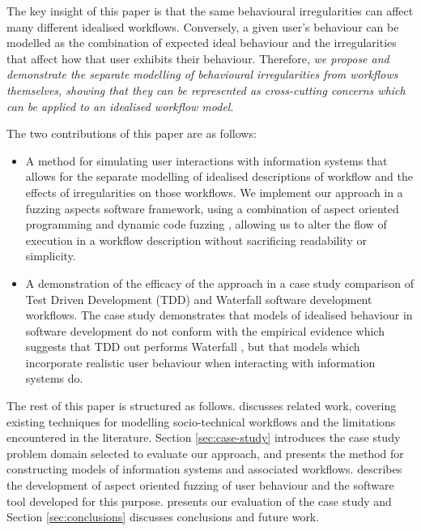 \documentclass{llncs}
\begin{document}
The key insight of this paper is that the same behavioural irregularities can affect many different idealised
workflows.  Conversely, a given user's behaviour can be modelled as the combination of expected ideal behaviour and the
irregularities that affect how that user exhibits their behaviour.  Therefore, \emph{we propose and demonstrate the
  separate modelling of behavioural irregularities from workflows themselves, showing that they can be represented as
  cross-cutting concerns which can be applied to an idealised workflow model}.

The two contributions of this paper are as follows:

\begin{itemize}

\item A method for simulating user interactions with information systems that allows for the separate modelling of
  idealised descriptions of workflow and the effects of irregularities on those workflows.  We implement our approach in
  a fuzzing aspects software framework, using a combination of aspect oriented programming \cite{filman01aspect} and
  dynamic code fuzzing \citep{takanen08fuzzing}, allowing us to alter the flow of execution in a workflow description
  without sacrificing readability or simplicity.

\item A demonstration of the efficacy of the approach in a case study comparison of Test Driven Development (TDD) and
  Waterfall software development workflows.  The case study demonstrates that models of idealised behaviour in software
  development do not conform with the empirical evidence which suggests that TDD out performs Waterfall
  \citep{Bhat2006TestDrivenDevelopment,George2004TestDrivenDevelopment,Huang2009EmpiricalTestFirstProgramming}, but that
  models which incorporate realistic user behaviour when interacting with information systems do.

\end{itemize}

The rest of this paper is structured as follows.   discusses related work, covering existing
techniques for modelling socio-technical workflows and the limitations encountered in the literature.  Section
\ref{sec:case-study} introduces the case study problem domain selected to evaluate our approach, and presents the method
for constructing models of information systems and associated workflows.  describes the development of
aspect oriented fuzzing of user behaviour and the software tool developed for this purpose.  
presents our evaluation of the case study and Section \ref{sec:conclusions} discusses conclusions and future work.
\end{document}
